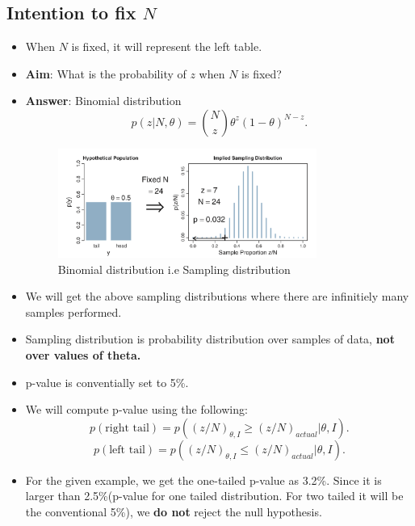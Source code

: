 \documentclass[a4paper]{article}
\begin{document}
\subsection{Intention to fix $N$ }
\begin{itemize}
    \item When $N$ is fixed, it will represent the left table.
    \item \textbf{Aim}: What is the probability of $z$ when $N$ is fixed?
    \item \textbf{Answer}: Binomial distribution 
        \[
            p(z|N, \theta) = \binom{N}{z} \theta^{z} (1-\theta)^{N-z}
        .\]
        \begin{figure}[H]
            \centering
            \includegraphics[width=0.8\textwidth]{binomial_sampling_distribution}
            \caption{Binomial distribution i.e Sampling distribution}
            \label{fig:binomial_sampling_distribution}
        \end{figure} 
    \item We will get the above sampling distributions where there are infinitiely many samples performed.
    \item Sampling distribution is probability distribution over samples of data, \textbf{not over values of theta.}  
    \item p-value is conventially set to 5\%.
    \item We will compute p-value using the following:
        \[
            p(\text{right tail}) = p((z/N)_{\theta, I} \geq (z/N)_{actual}|\theta, I)
        .\] 
        \[
            p(\text{left tail}) = p((z/N)_{\theta, I} \leq (z/N)_{actual}|\theta, I)
        .\] 
    \item For the given example, we get the one-tailed p-value as 3.2\%. Since it is larger than 2.5\%(p-value for one tailed distribution. For two tailed it will be the conventional 5\%), we \textbf{do not} reject the null hypothesis. 
\end{itemize}
\end{document}
